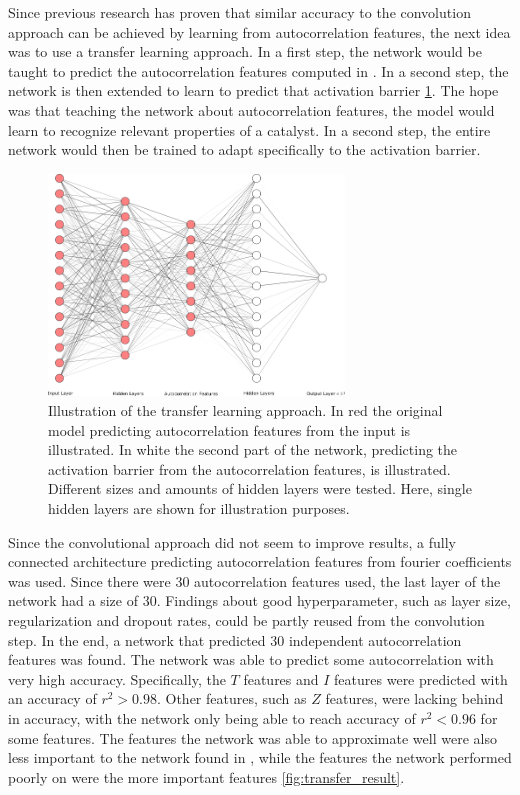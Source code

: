 Since previous research has proven that similar accuracy to the convolution approach can be achieved by learning from autocorrelation features,
the next idea was to use a transfer learning approach.
In a first step, the network would be taught to predict the autocorrelation features computed in \cite{friederich_dos}.
In a second step, the network is then extended to learn to predict that activation barrier \ref{fig:transferlearn}.
The hope was that teaching the network about autocorrelation features, the model would learn to recognize relevant properties of a catalyst.
In a second step, the entire network would then be trained to adapt specifically to the activation barrier.

\begin{figure} [h]
    \centering
    \includegraphics[width=0.7\textwidth]{figures/regression/fourier/nn.png} 
    \caption{Illustration of the transfer learning approach.
        In red the original model predicting autocorrelation features from the input is illustrated.
        In white the second part of the network, predicting the activation barrier from the autocorrelation features, is illustrated.
        Different sizes and amounts of hidden layers were tested. Here, single hidden layers are shown for illustration purposes.
    }
    \label{fig:transferlearn}
\end{figure}

Since the convolutional approach did not seem to improve results, a fully connected architecture predicting autocorrelation features from fourier coefficients 
was used.
Since there were 30 autocorrelation features used, the last layer of the network had a size of 30.
Findings about good hyperparameter, such as layer size, regularization and dropout rates, could be partly reused from the convolution step.
In the end, a network that predicted 30 independent autocorrelation features was found.
The network was able to predict some autocorrelation with very high accuracy. Specifically, the $T$ features and $I$ features were
predicted with an accuracy of $r^2 > 0.98$. 
Other features, such as $Z$ features, were lacking behind in accuracy, with the network only being able to reach accuracy of $r^2<0.96$ for some features.
The features the network was able to approximate well were also less important to the network found in \cite{friederich_dos}, while the features 
the network performed poorly on were the more important features \ref{fig:transfer_result}.

